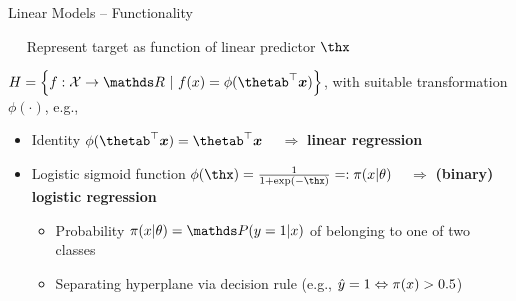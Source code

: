 \begin{vbframe}{Linear Models -- Functionality}

  
\medskip

 ~~ Represent target as function of linear predictor
$\thx$

\medskip


$\Hspace = \left\{f: \Xspace \to \R ~|~\fx = \phi(\thetab^\top \xv)\right\}$, 
with suitable transformation $\phi(\cdot)$, e.g.,

\begin{itemize}
  \item Identity $\phi(\thetab^\top \xv) = \thetab^\top \xv$ 
  ~ $\Rightarrow$ \textbf{linear regression}
  \item Logistic sigmoid function $\phi(\thx) = \frac{1}{1 + \exp(- \thx)} 
  =: \pixt$
  ~ $\Rightarrow$ \textbf{(binary) logistic regression}
  \begin{itemize}
    \footnotesize
    \item Probability $\pixt = \post$ of belonging to one of two classes
    \item Separating hyperplane via decision rule 
    (e.g., $\hat{y} = 1 \Leftrightarrow \pi(x) > 0.5$)
  \end{itemize}
\end{itemize}


\end{vbframe}
